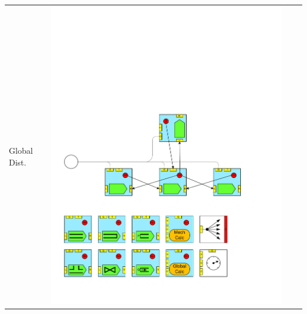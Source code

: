 \begin{table}
\begin{center}
\begin{tabular}{|p{2cm}|c|p{2cm}|c|}
Global Dist. 	&\includegraphics[page=19, scale=0.25]{./figs/1dcfd/ElementalProcessors.pdf} &

\end{tabular}
\end{center}
\end{table}
